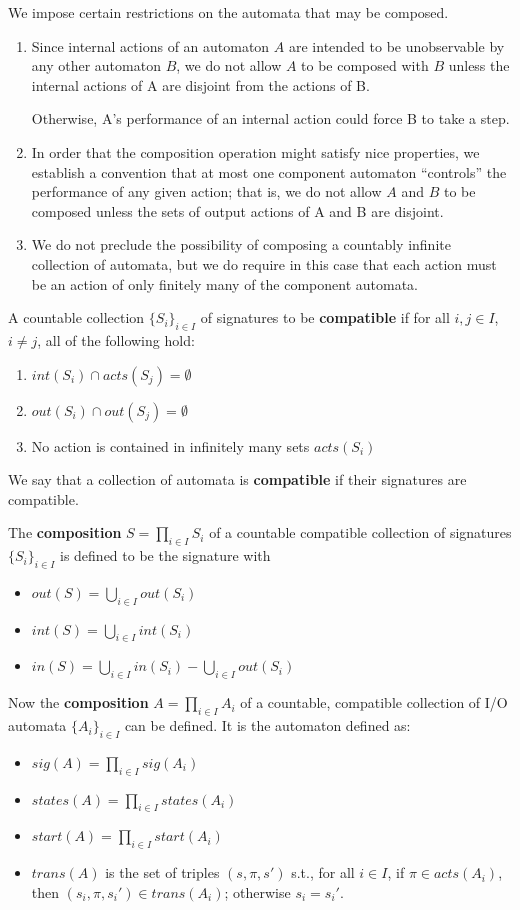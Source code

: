 \documentclass[11pt]{article}
\begin{document}
We impose certain restrictions on the automata that may be composed.
\begin{enumerate}
\item Since internal actions of an automaton \(A\) are intended to be unobservable by any other automaton
\(B\), we do not allow \(A\) to be composed with \(B\) unless the internal actions of A are
disjoint from the actions of B.

Otherwise, A's performance of an internal action could force B to take a step.
\item In order that the composition operation might satisfy nice properties, we establish a convention
that at most one component automaton ``controls'' the performance of any given action; that is, we do
not allow \(A\) and \(B\) to be composed unless the sets of output actions of A and B are disjoint.
\item We do not preclude the possibility of composing a countably infinite collection of automata, but we
do require in this case that each action must be an action of only finitely many of the component automata.
\end{enumerate}

A countable collection \(\{S_i\}_{i\in I}\) of signatures to be \textbf{compatible} if for all \(i,j\in I\),
\(i\neq j\), all of the following hold:
\begin{enumerate}
\item \(int(S_i)\cap acts(S_j)=\emptyset\)
\item \(out(S_i)\cap out(S_j)=\emptyset\)
\item No action is contained in infinitely many sets \(acts(S_i)\)
\end{enumerate}
We say that a collection of automata is \textbf{compatible} if their signatures are compatible.

The \textbf{composition} \(S=\prod_{i\in I}S_i\) of a countable compatible collection of signatures
\(\{S_i\}_{i\in I}\) is defined to be the signature with
\begin{itemize}
\item \(out(S)=\bigcup_{i\in I}out(S_i)\)
\item \(int(S)=\bigcup_{i\in I}int(S_i)\)
\item \(in(S)=\bigcup_{i\in I}in(S_i)-\bigcup_{i\in I}out(S_i)\)
\end{itemize}

Now the \textbf{composition} \(A=\prod_{i\in I}A_i\) of a countable, compatible collection of I/O automata
\(\{A_i\}_{i\in I}\) can be defined. It is the automaton defined as:
\begin{itemize}
\item \(sig(A)=\prod_{i\in I}sig(A_i)\)
\item \(states(A)=\prod_{i\in I}states(A_i)\)
\item \(start(A)=\prod_{i\in I}start(A_i)\)
\item \(trans(A)\) is the set of triples \((s,\pi,s')\) s.t., for all \(i\in I\), if \(\pi\in acts(A_i)\),
then \((s_i,\pi,s_i')\in trans(A_i)\); otherwise \(s_i=s_i'\).
\end{itemize}
\end{document}
